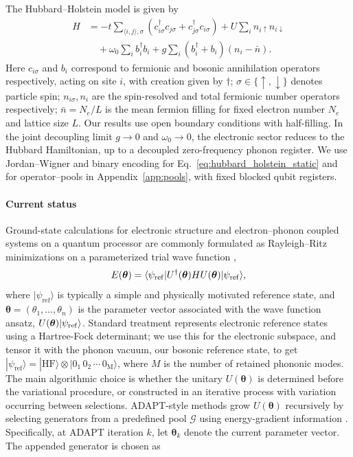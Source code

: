 \documentclass[
  reprint,
  amsmath,
  amssymb,
  aps,
  pra,
  nofootinbib,
  superscriptaddress,
  floatfix
]{revtex4-2}
\newcommand{\ket}[1]{|#1\rangle}
\newcommand{\bra}[1]{\langle #1|}
\begin{document}
The Hubbard--Holstein model is given by
\begin{align}
H
&=-t\sum_{\langle i,j\rangle,\sigma}
(c_{i\sigma}^{\dagger}c_{j\sigma}+c_{j\sigma}^{\dagger}c_{i\sigma})
+U\sum_i n_{i\uparrow}n_{i\downarrow}
\nonumber\\
&\quad+\omega_0\sum_i b_i^\dagger b_i
+g\sum_i(b_i^\dagger+b_i)(n_i-\bar n).
\label{eq:hubbard_holstein_static}
\end{align}
Here \(c_{i\sigma}\) and \(b_i\) correspond to fermionic and bosonic annihilation operators respectively, acting on site $i$, with creation given by $\dagger$; $\sigma \in\{\uparrow, \downarrow\}$ denotes particle spin;
\(n_{i\sigma}, n_i\) are the spin-resolved and total fermionic number operators respectively; \(\bar n=N_e/L\) is the mean fermion filling
for fixed electron number \(N_e\) and lattice size \(L\). Our results use open boundary conditions with half-filling.
In the joint decoupling limit $g\to0$ and $\omega_0\to0$, the electronic sector reduces to the Hubbard Hamiltonian, up to a decoupled zero-frequency phonon register. We use Jordan--Wigner and binary encoding for Eq.~\eqref{eq:hubbard_holstein_static} and for operator--pools in Appendix~\ref{app:pools}, with fixed blocked qubit registers.


\paragraph*{Current status}
Ground-state calculations for electronic structure and electron--phonon coupled systems on a quantum processor are commonly formulated as Rayleigh--Ritz minimizations on a parameterized trial wave function \cite{Peruzzo2014,McClean2016,Kandala2017},
\begin{equation}
E(\boldsymbol{\theta})=
\bra{\psi_{\rm ref}}U^\dagger(\boldsymbol{\theta})HU(\boldsymbol{\theta})\ket{\psi_{\rm ref}},
\label{eq:rayleigh_static}
\end{equation}
where \(\ket{\psi_{\mathrm{ref}}}\) is typically a simple and physically motivated reference state, and $\boldsymbol{\theta}=(\theta_1,\ldots,\theta_n)$ is the parameter vector associated with the wave function ansatz, $U(\boldsymbol{\theta})\ket{\psi_{\rm ref}}$. Standard treatment represents electronic reference states using a Hartree-Fock determinant; we use this for the electronic subspace, and tensor it with the phonon vacuum, our bosonic reference state, to get \(\ket{\psi_{\mathrm{ref}}}=\ket{\mathrm{HF}}\otimes\ket{0_1\,0_2\,\cdots\,0_{\mathrm{M}}}\), where \(M\) is the number of retained phononic modes. The main algorithmic choice is whether the unitary \(U(\boldsymbol{\theta})\) is determined before the variational procedure, or constructed in an iterative process with variation occurring between selections. ADAPT-style methods grow \(U(\boldsymbol{\theta})\) recursively by selecting generators from a predefined pool \(\mathcal{G}\) using energy-gradient information \cite{Grimsley2019,Tang2021,Yordanov2021}. Specifically, at ADAPT iteration \(k\), let \(\boldsymbol{\theta}_k\) denote the current parameter vector. The appended generator is chosen as
\end{document}
